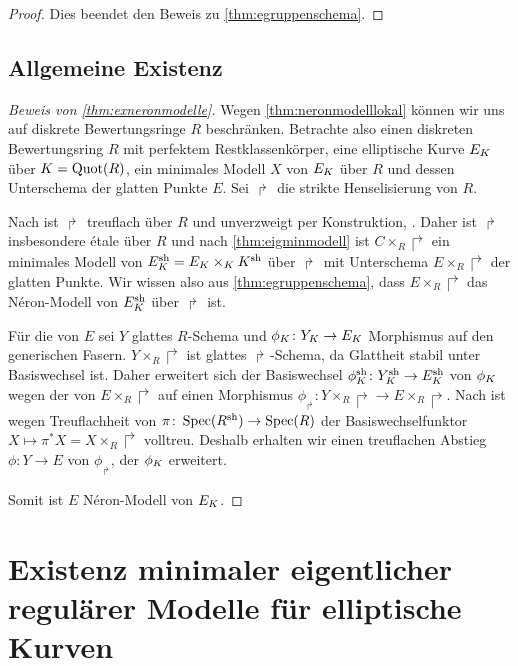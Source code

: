 \documentclass[german]{scrreprt}
\begin{document}
\begin{Satz}
\begin{proof}
    Dies beendet den Beweis zu \ref{thm:egruppenschema}.
  \end{proof}
\end{Satz}


\section{Allgemeine Existenz}
\begin{proof}[Beweis von \ref{thm:exneronmodelle}]
  Wegen \ref{thm:neronmodelllokal} können wir uns auf
  diskrete Bewertungsringe $R$ beschränken.
  Betrachte also einen diskreten Bewertungsring $R$ mit perfektem
  Restklassenkörper, eine elliptische Kurve $E_{K}$ über $K=\operatorname{Quot}(R)$,
  ein minimales Modell $X$ von $E_{K}$ über $R$ und dessen Unterschema
  der glatten Punkte $E$.
  Sei $\Rsh$ die strikte Henselisierung von $R$.

  Nach \cite[Chapter 2.4, Corollary 9]{neron} ist $\Rsh$ treuflach
  über $R$ und unverzweigt per Konstruktion,
  \cite[vgl.][Chapter 2.3, Proposition 11]{neron}.
  Daher ist $\Rsh$ insbesondere étale über $R$ und nach
  \ref{thm:eigminmodell} ist $C\times_R\Rsh$ ein minimales Modell von
  $E_\Ksh=E_\K\times_\K\Ksh$ über $\Rsh$ mit Unterschema
  $E\times_R\Rsh$ der glatten Punkte.
  Wir wissen also aus \ref{thm:egruppenschema}, dass $E\times_R\Rsh$
  das Néron-Modell von $E_\Ksh$ über $\Rsh$ ist.

  Für die \NAbbEig von $E$ sei $Y$ glattes $R$-Schema und
  $\phi_{K}\colon Y_{K}\to E_{K}$ Morphismus auf den generischen Fasern.
  $Y\times_R\Rsh$ ist glattes $\Rsh$-Schema, da Glattheit stabil unter
  Basiswechsel ist. Daher erweitert sich der Basiswechsel
  $\phi_\Ksh\colon Y_\Ksh\to E_\Ksh$ von $\phi_{K}$ wegen der \NAbbEig
  von $E\times_R\Rsh$ auf einen Morphismus $\phi_\Rsh\colon
  Y\times_R\Rsh\to E\times_R\Rsh$.
  Nach \cite[Chapter 6.1, Theorem 6]{neron} ist wegen Treuflachheit
  von $\pi\colon\operatorname{Spec}(R^{\text{sh}})\to\operatorname{Spec}(R)$ der Basiswechselfunktor
  $X\mapsto \pi^*X=X\times_R\Rsh$ volltreu. Deshalb erhalten wir einen
  treuflachen Abstieg $\phi\colon Y\to E$ von $\phi_\Rsh$, der
  $\phi_{K}$ erweitert.

  Somit ist $E$ Néron-Modell von $E_{K}$.
\end{proof}



\chapter{Existenz minimaler eigentlicher regulärer Modelle für
  elliptische Kurven}
\end{document}
